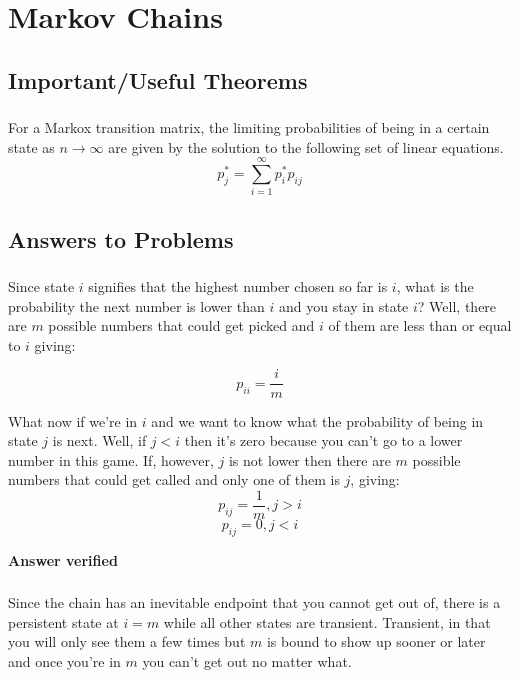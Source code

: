 
\chapter{Markov Chains}

\section{Important/Useful Theorems}

\subsection{}
For a Markox transition matrix, the limiting probabilities of being in a certain state as $n \rightarrow \infty$ are given by the solution to the following set of linear equations.
\begin{equation}
	p_j^* = \sum_{i=1}^{\infty} p_i^* p_{ij}
\end{equation}

\section{Answers to Problems}
\subsection{}
Since state $i$ signifies that the highest number chosen so far is $i$, what is the probability the next number is lower than $i$ and you stay in state $i$?  Well, there are $m$ possible numbers that could get picked and $i$ of them are less than or equal to $i$ giving:

\begin{equation}
	p_{ii} = \frac{i}{m}
\end{equation}

What now if we're in $i$ and we want to know what the probability of being in state $j$ is next.  Well, if $j<i$ then it's zero because you can't go to a lower number in this game.  If, however, $j$ is not lower then there are $m$ possible numbers that could get called and only one of them is $j$, giving:
\begin{equation}
	p_{ij} = \frac{1}{m}, j>i
\end{equation}
\begin{equation}
	p_{ij} = 0, j<i
\end{equation}

\textbf{Answer verified}

\subsection{}
Since the chain has an inevitable endpoint that you cannot get out of, there is a persistent state at $i=m$ while all other states are transient.  Transient, in that you will only see them a few times but $m$ is bound to show up sooner or later and once you're in $m$ you can't get out no matter what.

